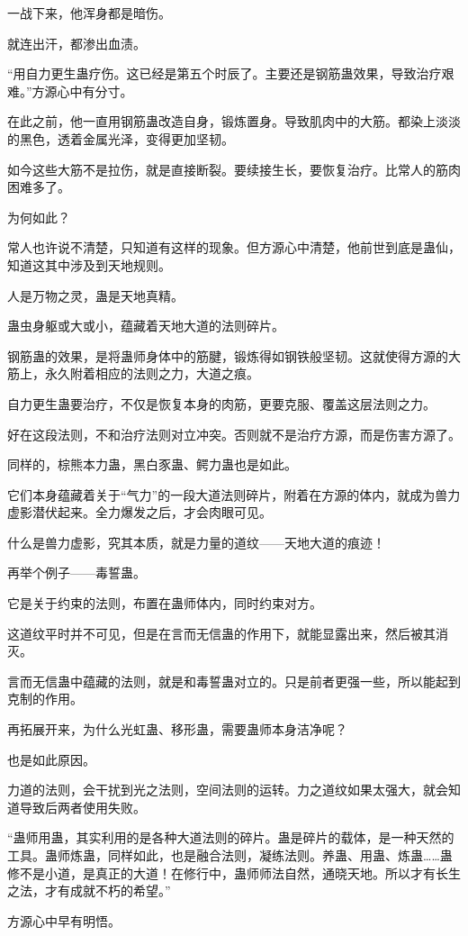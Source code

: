 \begin{this_body}
一战下来，他浑身都是暗伤。

就连出汗，都渗出血渍。

“用自力更生蛊疗伤。这已经是第五个时辰了。主要还是钢筋蛊效果，导致治疗艰难。”方源心中有分寸。

在此之前，他一直用钢筋蛊改造自身，锻炼置身。导致肌肉中的大筋。都染上淡淡的黑色，透着金属光泽，变得更加坚韧。

如今这些大筋不是拉伤，就是直接断裂。要续接生长，要恢复治疗。比常人的筋肉困难多了。

为何如此？

常人也许说不清楚，只知道有这样的现象。但方源心中清楚，他前世到底是蛊仙，知道这其中涉及到天地规则。

人是万物之灵，蛊是天地真精。

蛊虫身躯或大或小，蕴藏着天地大道的法则碎片。

钢筋蛊的效果，是将蛊师身体中的筋腱，锻炼得如钢铁般坚韧。这就使得方源的大筋上，永久附着相应的法则之力，大道之痕。

自力更生蛊要治疗，不仅是恢复本身的肉筋，更要克服、覆盖这层法则之力。

好在这段法则，不和治疗法则对立冲突。否则就不是治疗方源，而是伤害方源了。

同样的，棕熊本力蛊，黑白豕蛊、鳄力蛊也是如此。

它们本身蕴藏着关于“气力”的一段大道法则碎片，附着在方源的体内，就成为兽力虚影潜伏起来。全力爆发之后，才会肉眼可见。

什么是兽力虚影，究其本质，就是力量的道纹——天地大道的痕迹！

再举个例子——毒誓蛊。

它是关于约束的法则，布置在蛊师体内，同时约束对方。

这道纹平时并不可见，但是在言而无信蛊的作用下，就能显露出来，然后被其消灭。

言而无信蛊中蕴藏的法则，就是和毒誓蛊对立的。只是前者更强一些，所以能起到克制的作用。

再拓展开来，为什么光虹蛊、移形蛊，需要蛊师本身洁净呢？

也是如此原因。

力道的法则，会干扰到光之法则，空间法则的运转。力之道纹如果太强大，就会知道导致后两者使用失败。

“蛊师用蛊，其实利用的是各种大道法则的碎片。蛊是碎片的载体，是一种天然的工具。蛊师炼蛊，同样如此，也是融合法则，凝练法则。养蛊、用蛊、炼蛊……蛊修不是小道，是真正的大道！在修行中，蛊师师法自然，通晓天地。所以才有长生之法，才有成就不朽的希望。”

方源心中早有明悟。


\end{this_body}
